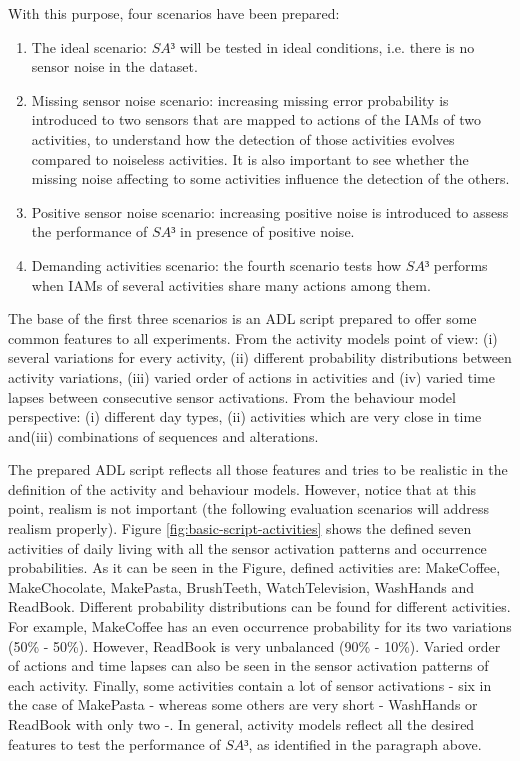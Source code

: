 With this purpose, four scenarios have been prepared: 

\begin{enumerate}
 \item The ideal scenario: $SA³$ will be tested in ideal conditions, i.e. there is no sensor noise in the dataset.
 \item Missing sensor noise scenario: increasing missing error probability is introduced to two sensors that are mapped to actions of the IAMs of two activities, to understand how the detection of those activities evolves compared to noiseless activities. It is also important to see whether the missing noise affecting to some activities influence the detection of the others.
 \item Positive sensor noise scenario: increasing positive noise is introduced to assess the performance of $SA³$ in presence of positive noise.
 \item Demanding activities scenario: the fourth scenario tests how $SA³$ performs when IAMs of several activities share many actions among them. 
\end{enumerate}

The base of the first three scenarios is an ADL script prepared to offer some common features to all experiments. From the activity models point of view: (i) several variations for every activity, (ii) different probability distributions between activity variations, (iii) varied order of actions in activities and (iv) varied time lapses between consecutive sensor activations. From the behaviour model perspective: (i) different day types, (ii) activities which are very close in time and(iii) combinations of sequences and alterations.

The prepared ADL script reflects all those features and tries to be realistic in the definition of the activity and behaviour models. However, notice that at this point, realism is not important (the following evaluation scenarios will address realism properly). Figure \ref{fig:basic-script-activities} shows the defined seven activities of daily living with all the sensor activation patterns and occurrence probabilities. As it can be seen in the Figure, defined activities are: MakeCoffee, MakeChocolate, MakePasta, BrushTeeth, WatchTelevision, WashHands and ReadBook. Different probability distributions can be found for different activities. For example, MakeCoffee has an even occurrence probability for its two variations (50\% - 50\%). However, ReadBook is very unbalanced (90\% - 10\%). Varied order of actions and time lapses can also be seen in the sensor activation patterns of each activity. Finally, some activities contain a lot of sensor activations - six in the case of MakePasta - whereas some others are very short - WashHands or ReadBook with only two -. In general, activity models reflect all the desired features to test the performance of $SA³$, as identified in the paragraph above.

